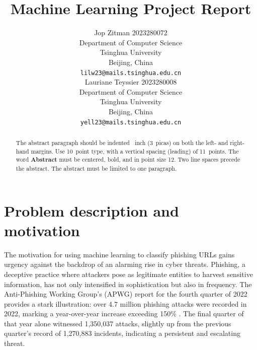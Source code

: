 \documentclass{article}
\title{Machine Learning Project Report}
\author{
    Jop Zitman 2023280072\\
    Department of Computer Science\\
    Tsinghua University\\
    Beijing, China \\
    \texttt{lilw23@mails.tsinghua.edu.cn} \\
    \And
    Lauriane Teyssier 2023280008\\
    Department of Computer Science\\
    Tsinghua University\\
    Beijing, China \\
    \texttt{yell23@mails.tsinghua.edu.cn} \\
}
\begin{document}
    \maketitle

    \begin{abstract}
        The abstract paragraph should be indented ~inch (3~picas) on
        both the left- and right-hand margins.
        Use 10~point type, with a vertical
        spacing (leading) of 11~points.
        The word \textbf{Abstract} must be centered,
        bold, and in point size 12.
        Two line spaces precede the abstract.
        The abstract must be limited to one paragraph.
    \end{abstract}


%


    \section{Problem description and motivation}\label{sec:problem-description-and-motivation}

    The motivation for using machine learning to classify phishing URLs gains urgency against the backdrop of an alarming rise in cyber threats.
    Phishing, a deceptive practice where attackers pose as legitimate entities to harvest sensitive information, has not only intensified in sophistication but also in frequency.
    The Anti-Phishing Working Group's (APWG) report for the fourth quarter of 2022 provides a stark illustration: over 4.7 million phishing attacks were recorded in 2022, marking a year-over-year increase exceeding 150\% \cite{PhishingActivityTrendsReport}.
    The final quarter of that year alone witnessed 1,350,037 attacks, slightly up from the previous quarter's record of 1,270,883 incidents, indicating a persistent and escalating threat.
\end{document}
